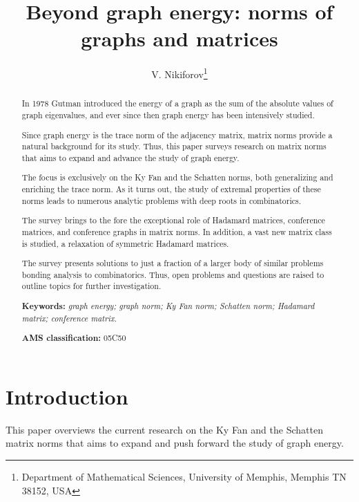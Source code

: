 \documentclass[12pt]{article}%
\begin{document}
\title{\textbf{Beyond graph energy: norms of graphs and matrices}}
\author{V. Nikiforov\thanks{Department of Mathematical Sciences, University of
Memphis, Memphis TN 38152, USA}}
\maketitle

\begin{abstract}
In 1978 Gutman introduced the energy of a graph as the sum of the absolute
values of graph eigenvalues, and ever since then graph energy has been
intensively studied.

Since graph energy is the trace norm of the adjacency matrix, matrix norms
provide a natural background for its study. Thus, this paper surveys research
on matrix norms that aims to expand and advance the study of graph energy.

The focus is exclusively on the Ky Fan and the Schatten norms, both
generalizing and enriching the trace norm. As it turns out, the study of
extremal properties of these norms leads to numerous analytic problems with
deep roots in combinatorics.

The survey brings to the fore the exceptional role of Hadamard matrices,
conference matrices, and conference graphs in matrix norms. In addition, a
vast new matrix class is studied, a relaxation of symmetric Hadamard matrices.

The survey presents solutions to just a fraction of a larger body of similar
problems bonding analysis to combinatorics. Thus, open problems and questions
are raised to outline topics for further investigation.\textit{\medskip}

\textbf{Keywords: }\textit{graph energy; graph norm; Ky Fan norm; Schatten
norm; Hadamard matrix; conference matrix.\medskip}

\textbf{AMS classification: }05C50

\newpage

\end{abstract}
\tableofcontents

\newpage

\section{Introduction}

This paper overviews the current research on the Ky Fan and the Schatten
matrix norms that aims to expand and push forward the study of graph energy.
\end{document}
